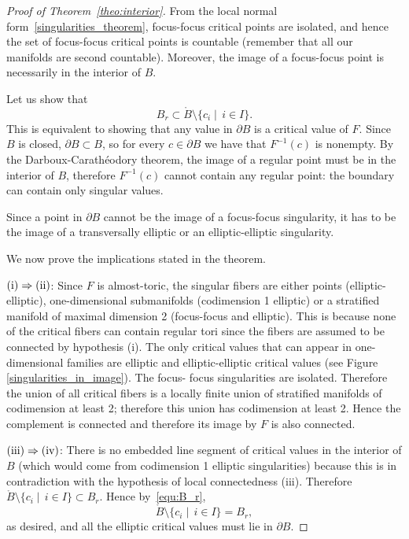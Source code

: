 \documentclass[11pt]{article}
\begin{document}
\begin{proof}[Proof of Theorem~\ref{theo:interior}]
  From the local normal form~\ref{singularities_theorem}, focus-focus
  critical points are isolated, and hence the set of focus-focus
  critical points is countable (remember that all our manifolds are
  second countable). Moreover, the image of a focus-focus point is
  necessarily in the interior of $B$.

  Let us show that
  \begin{equation}
    B_r \subset \mathring{B} \setminus \{c_i\mid\, i\in I\}.
    \label{equ:B_r}  
  \end{equation}
  This is equivalent to showing that any value in $\partial B$ is a
  critical value of $F$. Since $B$ is closed, $\partial B \subset B$,
  so for every $c \in \partial B$ we have that $F^{-1}(c)$ is
  nonempty. By the Darboux-Carath\'eodory theorem, the image of a
  regular point must be in the interior of $B$, therefore $F^{-1}(c)$
  cannot contain any regular point: the boundary can contain only
  singular values.

  Since a point in $\partial B$ cannot be the image of a focus-focus
  singularity, it has to be the image of a transversally elliptic or
  an elliptic-elliptic singularity.

  We now prove the implications stated in the theorem.

  \noindent ${\rm (i)}\Rightarrow {\rm (ii)}$: Since $F$ is
  almost-toric, the singular fibers are either points
  (elliptic-elliptic), one-dimensional submanifolds (codimension 1
  elliptic) or a stratified manifold of maximal dimension 2
  (focus-focus and elliptic). This is because none of the critical
  fibers can contain regular tori since the fibers are assumed to be
  connected by hypothesis (i).  The only critical values that can
  appear in one-dimensional families are elliptic and
  elliptic-elliptic critical values (see Figure
  \ref{singularities_in_image}). The focus- focus singularities are
  isolated. Therefore the union of all critical fibers is a locally
  finite union of stratified manifolds of codimension at least 2;
  therefore this union has codimension at least 2. Hence the
  complement is connected and therefore its image by $F$ is also
  connected.


  \noindent ${\rm (iii)} \Rightarrow {\rm (iv)}$: There is no embedded
  line segment of critical values in the interior of $B$ (which would
  come from codimension 1 elliptic singularities) because this is in
  contradiction with the hypothesis of local connectedness
  \textup{(iii)}.  Therefore $\mathring{B} \setminus \{c_i\mid\, i\in
  I\} \subset B_r$.  Hence by~\eqref{equ:B_r}, $$\mathring{B}
  \setminus \{c_i\mid\, i\in I\} = B_r,$$ as desired, and all the
  elliptic critical values must lie in $\partial B$.


\end{proof}
\end{document}

